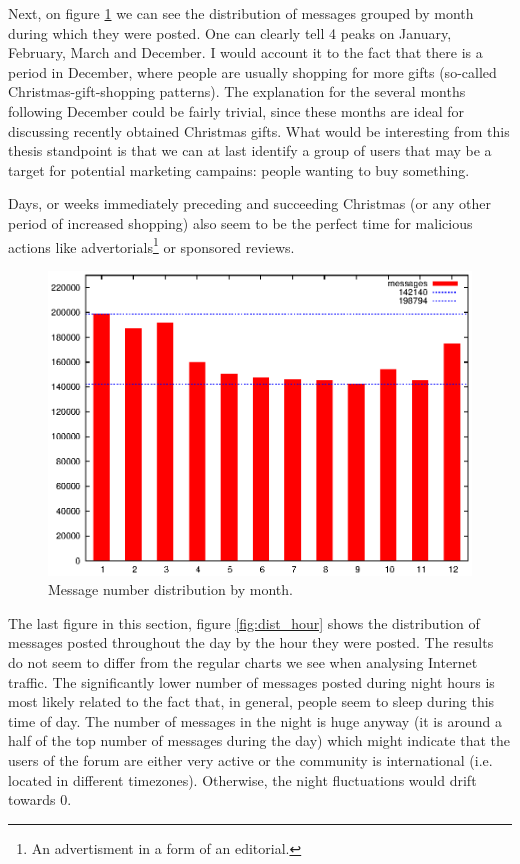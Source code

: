     Next, on figure \ref{fig:dist_month} we can see the distribution of messages grouped by month during which they were posted. One can clearly tell 4 peaks on January, February, March and December. I would account it to the fact that there is a  period in December, where people are usually shopping for more gifts (so-called Christmas-gift-shopping patterns).\cite{FischerArnold1990,ArnoldReynolds2003} The explanation for the several months following December could be fairly trivial, since these months are ideal for discussing recently obtained Christmas gifts. What would be interesting from this thesis standpoint is that we can at last identify a group of users that may be a target for potential marketing campains: people wanting to buy something.
    
    Days, or weeks immediately preceding and succeeding Christmas (or any other period of increased shopping) also seem to be the perfect time for malicious actions like advertorials\footnote{An advertisment in a form of an editorial.} or sponsored reviews.
    \begin{figure}[H]
      \includegraphics[width=\textwidth]{chapters/03_implementation/monthly}
      \caption{Message number distribution by month.}
      \label{fig:dist_month}
    \end{figure}
    
    The last figure in this section, figure \ref{fig:dist_hour} shows the distribution of messages posted throughout the day by the hour they were posted. The results do not seem to differ from the regular charts we see when analysing Internet traffic.\cite{GebertPries2012} The significantly lower number of messages posted during night hours is most likely related to the fact that, in general, people seem to sleep during this time of day.\cite{Carskadon2002} The number of messages in the night is huge anyway (it is around a half of the top number of messages during the day) which might indicate that the users of the forum are either very active or the community is international (i.e. located in different timezones). Otherwise, the night fluctuations would drift towards 0.
    
